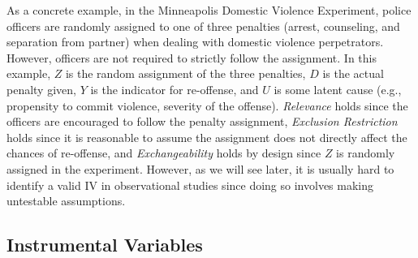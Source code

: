 As a concrete example, in the Minneapolis Domestic Violence Experiment, police officers are randomly assigned to one of three penalties (arrest, counseling, and separation from partner) when dealing with domestic violence perpetrators. However, officers are not required to strictly follow the assignment. In this example, \(Z\) is the random assignment of the three penalties, \(D\) is the actual penalty given, \(Y\) is the indicator for re-offense, and \(U\) is some latent cause (e.g., propensity to commit violence, severity of the offense). \textit{Relevance} holds since the officers are encouraged to follow the penalty assignment, \textit{Exclusion Restriction} holds since it is reasonable to assume the assignment does not directly affect the chances of re-offense, and \textit{Exchangeability} holds by design since \(Z\) is randomly assigned in the experiment. However, as we will see later, it is usually hard to identify a valid IV in observational studies since doing so involves making untestable assumptions.


\subsection{Instrumental Variables}

